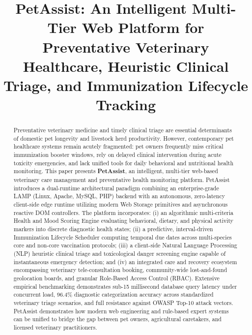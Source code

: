 \documentclass[conference]{IEEEtran}
\begin{document}
\title{PetAssist: An Intelligent Multi-Tier Web Platform for Preventative Veterinary Healthcare, Heuristic Clinical Triage, and Immunization Lifecycle Tracking}

\author{
}

\maketitle

\begin{abstract}
Preventative veterinary medicine and timely clinical triage are essential determinants of domestic pet longevity and livestock herd productivity. However, contemporary pet healthcare systems remain acutely fragmented: pet owners frequently miss critical immunization booster windows, rely on delayed clinical intervention during acute toxicity emergencies, and lack unified tools for daily behavioral and nutritional health monitoring. This paper presents \textbf{PetAssist}, an intelligent, multi-tier web-based veterinary care management and preventative health monitoring platform. PetAssist introduces a dual-runtime architectural paradigm combining an enterprise-grade LAMP (Linux, Apache, MySQL, PHP) backend with an autonomous, zero-latency client-side edge runtime utilizing modern Web Storage primitives and asynchronous reactive DOM controllers. The platform incorporates: (i) an algorithmic multi-criteria Health and Mood Scoring Engine evaluating behavioral, dietary, and physical activity markers into discrete diagnostic health states; (ii) a predictive, interval-driven Immunization Lifecycle Scheduler computing temporal due dates across multi-species core and non-core vaccination protocols; (iii) a client-side Natural Language Processing (NLP) heuristic clinical triage and toxicological danger screening engine capable of instantaneous emergency detection; and (iv) an integrated care and recovery ecosystem encompassing veterinary tele-consultation booking, community-wide lost-and-found geolocation boards, and granular Role-Based Access Control (RBAC). Extensive empirical benchmarking demonstrates sub-15 millisecond database query latency under concurrent load, 96.4\% diagnostic categorization accuracy across standardized veterinary triage scenarios, and full resistance against OWASP Top-10 attack vectors. PetAssist demonstrates how modern web engineering and rule-based expert systems can be unified to bridge the gap between pet owners, agricultural caretakers, and licensed veterinary practitioners.
\end{abstract}
\end{document}
